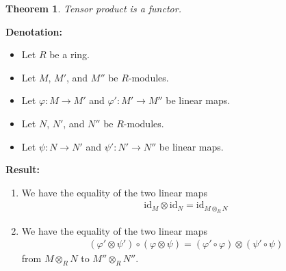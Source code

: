 \documentclass[a4paper]{book}
\theoremstyle{definition}
\newtheorem{theorem}[definition]{Theorem}
\begin{document}
\newpage
\begin{theorem}\textit{Tensor product is a functor.}

    \noindent\textbf{Denotation: } \begin{itemize}
        \item Let \(R\) be a ring.
        \item Let \(M\), \(M'\), and \(M''\) be \(R\)-modules.
        \item Let \(\varphi: M \rightarrow M'\) and \(\varphi': M' \rightarrow M''\) be linear maps.
        \item Let \(N\), \(N'\), and \(N''\) be \(R\)-modules.
        \item Let \(\psi: N \rightarrow N'\) and \(\psi': N' \rightarrow N''\) be linear maps.
    \end{itemize}

    \noindent\textbf{Result: } \begin{enumerate}
        \item We have the equality of the two linear maps
        \begin{align*}
            \text{id}_M \otimes \text{id}_N = \text{id}_{M \otimes_R N}
        \end{align*}
        \item We have the equality of the two linear maps
    \begin{align*}
        (\varphi' \otimes \psi') \circ (\varphi \otimes \psi) = (\varphi' \circ \varphi) \otimes (\psi' \circ \psi)
    \end{align*}
    from \(M \otimes_R N\) to \(M'' \otimes_R N''\).
    \end{enumerate}
\end{theorem}
\end{document}
